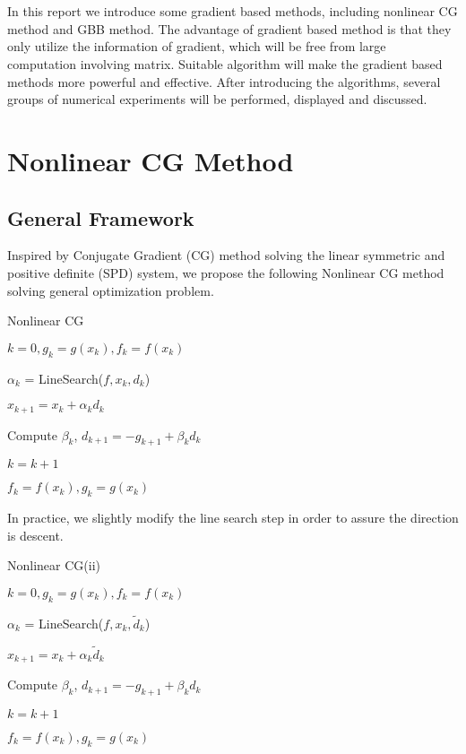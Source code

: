 \documentclass{article}
\begin{document}
	\maketitle
	\thispagestyle{fancy}
	\tableofcontents
	
	\section*{}

In this report we introduce some gradient based methods, including nonlinear CG method and GBB method. The advantage of gradient based method is that they only utilize the information of gradient, which will be free from large computation involving matrix. Suitable algorithm will make the gradient based methods more powerful and effective. After introducing the algorithms, several groups of numerical experiments will be performed, displayed and discussed. 

\section{Nonlinear CG Method}
\subsection{General Framework}
	Inspired by Conjugate Gradient (CG) method solving the linear symmetric and positive definite (SPD) system, we propose the following Nonlinear CG method solving general optimization problem. 

\begin{algorithm}[H]
	\caption{Nonlinear CG}
	$k=0, g_k = g(x_k), f_k = f(x_k)$
	
	{$\alpha_k$ = LineSearch($f, x_k, d_k$)
		
	$x_{k+1} = x_k + \alpha_k d_k$
	
	Compute $\beta_k$, $d_{k+1} = -g_{k+1} + \beta_{k}d_k$
	
	$k =k+1$
	
	$f_k = f(x_k), g_k = g(x_k)$
	}
\end{algorithm}
In practice, we slightly modify the line search step in order to assure the direction is descent. 
\begin{algorithm}[H]
	\caption{Nonlinear CG(ii)}
	$k=0, g_k = g(x_k), f_k = f(x_k)$
	
	{
		
		$\alpha_k$ = LineSearch($f, x_k, \tilde d_k$)
		
		$x_{k+1} = x_k + \alpha_k \tilde d_k$
		
		Compute $\beta_k$, $d_{k+1} = -g_{k+1} + \beta_{k}d_k$
		
		$k =k+1$
		
			$f_k = f(x_k), g_k = g(x_k)$
	}
\end{algorithm}
\end{document}
